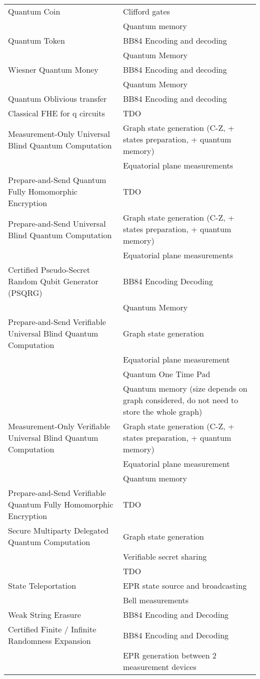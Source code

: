 \documentclass[11pt]{article}
\begin{document}
\begin{center}
\begin{tabular}{ll}
\hline
Quantum Coin & Clifford gates\\
 & Quantum memory\\
\hline
Quantum Token & BB84 Encoding and decoding\\
 & Quantum Memory\\
\hline
Wiesner Quantum Money & BB84 Encoding and decoding\\
 & Quantum Memory\\
\hline
Quantum Oblivious transfer & BB84 Encoding and decoding\\
\hline
Classical FHE for q circuits & TDO\\
\hline
Measurement-Only Universal Blind Quantum Computation & Graph state generation (C-Z, + states preparation, + quantum memory)\\
 & Equatorial plane measurements\\
\hline
Prepare-and-Send Quantum Fully Homomorphic Encryption & TDO\\
\hline
Prepare-and-Send Universal Blind Quantum Computation & Graph state generation (C-Z, + states preparation, + quantum memory)\\
 & Equatorial plane measurements\\
\hline
Certified Pseudo-Secret Random Qubit Generator (PSQRG) & BB84 Encoding Decoding\\
 & Quantum Memory\\
\hline
Prepare-and-Send Verifiable Universal Blind Quantum Computation & Graph state generation\\
 & Equatorial plane measurement\\
 & Quantum One Time Pad\\
 & Quantum memory (size depends on graph considered, do not need to store the whole graph)\\
\hline
Measurement-Only Verifiable Universal Blind Quantum Computation & Graph state generation (C-Z, + states preparation, + quantum memory)\\
 & Equatorial plane measurement\\
 & Quantum memory\\
\hline
Prepare-and-Send Verifiable Quantum Fully Homomorphic Encryption & TDO\\
\hline
Secure Multiparty Delegated Quantum Computation & Graph state generation\\
 & Verifiable secret sharing\\
 & TDO\\
\hline
State Teleportation & EPR state source and broadcasting\\
 & Bell measurements\\
\hline
Weak String Erasure & BB84 Encoding and Decoding\\
\hline
Certified Finite / Infinite Randomness Expansion & BB84 Encoding and Decoding\\
 & EPR generation between 2 measurement devices\\
\hline
\end{tabular}
\end{center}
\end{document}
